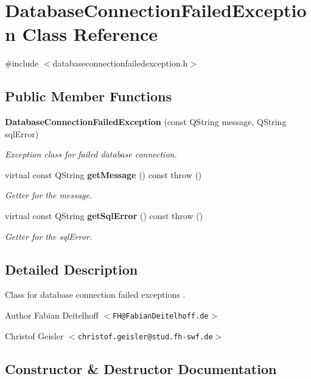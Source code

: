 \section{\-Database\-Connection\-Failed\-Exception \-Class \-Reference}
\label{d3/d31/classDatabaseConnectionFailedException}


{\ttfamily \#include $<$databaseconnectionfailedexception.\-h$>$}

\subsection*{\-Public \-Member \-Functions}
\begin{DoxyCompactItemize}
\item 
{\bf \-Database\-Connection\-Failed\-Exception} (const \-Q\-String message, \-Q\-String sql\-Error)
\begin{DoxyCompactList}\small\item\em \-Exception class for failed database connection. \end{DoxyCompactList}\item 
virtual const \-Q\-String {\bf get\-Message} () const   throw ()
\begin{DoxyCompactList}\small\item\em \-Getter for the message. \end{DoxyCompactList}\item 
virtual const \-Q\-String {\bf get\-Sql\-Error} () const   throw ()
\begin{DoxyCompactList}\small\item\em \-Getter for the sql\-Error. \end{DoxyCompactList}\end{DoxyCompactItemize}


\subsection{\-Detailed \-Description}
\-Class for database connection failed exceptions .

\begin{DoxyAuthor}{\-Author}
\-Fabian \-Deitelhoff $<${\tt \-F\-H@\-Fabian\-Deitelhoff.\-de}$>$ 

\-Christof \-Geisler $<${\tt christof.\-geisler@stud.\-fh-\/swf.\-de}$>$ 
\end{DoxyAuthor}


\subsection{\-Constructor \& \-Destructor \-Documentation}

